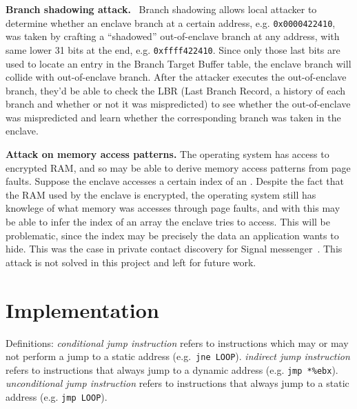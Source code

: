 \documentclass[sigplan, review]{acmart}
\begin{document}
\textbf{Branch shadowing attack.}~\cite{lee2016inferring} Branch shadowing allows local attacker to determine whether an enclave branch at a certain address, e.g. \texttt{0x0000422410}, was taken by crafting a ``shadowed'' out-of-enclave branch at any address, with same lower 31 bits at the end, e.g. \texttt{0xffff422410}. Since only those last bits are used to locate an entry in the Branch Target Buffer table, the enclave branch will collide with out-of-enclave branch. After the attacker executes the out-of-enclave branch, they'd be able to check the LBR (Last Branch Record, a history of each branch and whether or not it was mispredicted) to see whether the out-of-enclave was mispredicted and learn whether the corresponding branch was taken in the enclave.

\textbf{Attack on memory access patterns.} The operating system has access to encrypted RAM, and so may be able to derive memory access patterns from page faults. Suppose the enclave accesses a certain index of an . Despite the fact that the RAM used by the enclave is encrypted, the operating system still has knowlege of what memory was accesses through page faults, and with this may be able to infer the index of an array the enclave tries to access. This will be problematic, since the index may be precisely the data an application wants to hide. This was the case in private contact discovery for Signal messenger~\cite{signalprivaterecovery}. This attack is not solved in this project and left for future work.

\section{Implementation}
Definitions: \textit{conditional jump instruction} refers to instructions which may or may not perform a jump to a static address (e.g.\ \texttt{jne LOOP}). \textit{indirect jump instruction} refers to instructions that always jump to a dynamic address (e.g. \texttt{jmp *\%ebx}). \textit{unconditional jump instruction} refers to instructions that always jump to a static address (e.g. \texttt{jmp LOOP}).
\end{document}
